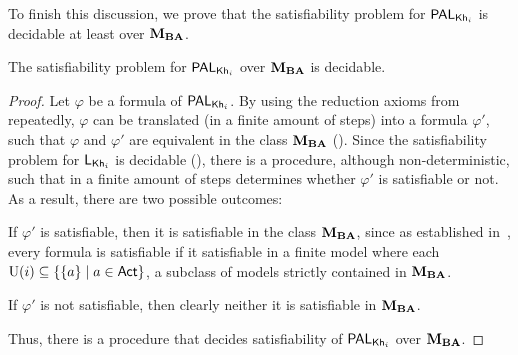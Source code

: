 

To finish this discussion, we prove that the satisfiability problem for $\mathsf{PAL}_{{\sf Kh}_i}$ is decidable at least over $\mathbf{M}_{\mathbf{BA}}$.

\medskip 

\begin{corollary}\label{cor:palsat}
The satisfiability problem for $\mathsf{PAL}_{{\sf Kh}_i}$ over $\mathbf{M}_{\mathbf{BA}}$ is decidable.
\end{corollary}
\begin{proof}
Let $\varphi$ be a formula of $\mathsf{PAL}_{{\sf Kh}_i}$. By using the reduction axioms from~ repeatedly, $\varphi$ can be translated (in a finite amount of steps) into a formula $\varphi'$, such that $\varphi$ and $\varphi'$ are equivalent in the class $\mathbf{M}_{\mathbf{BA}}$ (). 
Since the satisfiability problem for $\mathsf{L}_{{\sf Kh}_i}$ is decidable (\cite{AFSVQ21,AFSVQ23report}), there is a procedure, although non-deterministic, such that in a finite amount of steps determines whether $\varphi'$ is satisfiable or not.
As a result, there are two possible outcomes:
\begin{inlineenum}
\item If $\varphi'$ is satisfiable, then it is satisfiable in the class $\mathbf{M}_{\mathbf{BA}}$, since as established in~\cite{AFSVQ21,AFSVQ23report}, every formula is satisfiable if it satisfiable in a finite model where each $\operatorname{U}(i)\subseteq\{ \{ a \} \mid a\in{\rm \sf Act} \}$, a subclass of models strictly contained in $\mathbf{M}_{\mathbf{BA}}$.  
\item If $\varphi'$ is not satisfiable, then clearly neither it is satisfiable in $\mathbf{M}_{\mathbf{BA}}$. %
\end{inlineenum}
Thus, there is a procedure that decides satisfiability of $\mathsf{PAL}_{{\sf Kh}_i}$ over $\mathbf{M}_{\mathbf{BA}}$. 
\end{proof}
